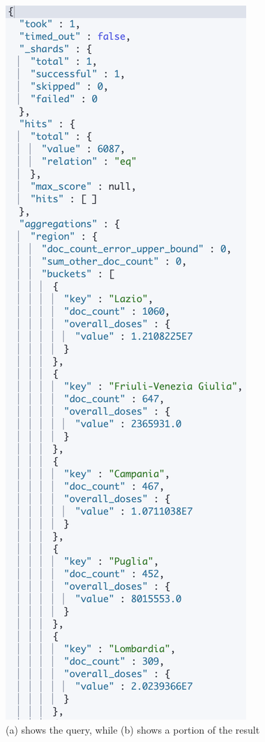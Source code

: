 \documentclass{article}[IEEEtran]
\begin{document}
\begin{figure}[H]
\begin{center}
\begin{minipage}[b]{0.4\textwidth}
    \includegraphics[width=\textwidth, frame]{Answer_Query_11.PNG}
     \subcaption{}
  \end{minipage}
  \caption{(a) shows the query, while (b) shows a portion of the result}
\end{center}
\end{figure}
\end{document}
